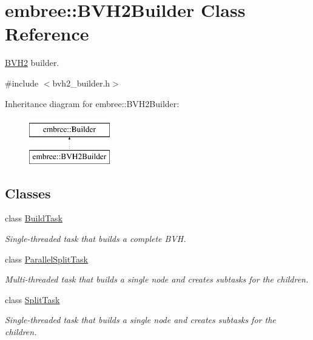 \hypertarget{classembree_1_1_b_v_h2_builder}{
\section{embree::BVH2Builder Class Reference}
\label{classembree_1_1_b_v_h2_builder}
}


\hyperlink{classembree_1_1_b_v_h2}{BVH2} builder.  




{\ttfamily \#include $<$bvh2\_\-builder.h$>$}

Inheritance diagram for embree::BVH2Builder:\begin{figure}[H]
\begin{center}
\leavevmode
\includegraphics[height=2.000000cm]{classembree_1_1_b_v_h2_builder}
\end{center}
\end{figure}
\subsection*{Classes}
\begin{DoxyCompactItemize}
\item 
class \hyperlink{classembree_1_1_b_v_h2_builder_1_1_build_task}{BuildTask}
\begin{DoxyCompactList}\small\item\em Single-\/threaded task that builds a complete BVH. \item\end{DoxyCompactList}\item 
class \hyperlink{classembree_1_1_b_v_h2_builder_1_1_parallel_split_task}{ParallelSplitTask}
\begin{DoxyCompactList}\small\item\em Multi-\/threaded task that builds a single node and creates subtasks for the children. \item\end{DoxyCompactList}\item 
class \hyperlink{classembree_1_1_b_v_h2_builder_1_1_split_task}{SplitTask}
\begin{DoxyCompactList}\small\item\em Single-\/threaded task that builds a single node and creates subtasks for the children. \item\end{DoxyCompactList}\end{DoxyCompactItemize}
